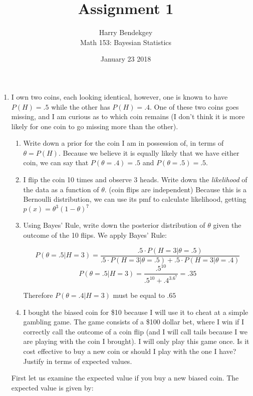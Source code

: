 \documentclass{article}
\title{Assignment 1}
\author{Harry Bendekgey \\ Math 153: Bayesian Statistics}
\date{January 23 2018}
\begin{document}
\maketitle

\begin{enumerate} 

\item I own two coins, each looking identical, however, one is known to have $P(H)=.5$ while the other has $P(H)=.4$.  One of these two coins goes missing, and I am curious as to which coin remains (I don't think it is more likely for one coin to go missing more than the other).
\begin{enumerate} 

\item Write down a prior for the coin I am in possession of, in terms of $\theta=P(H)$.
Because we believe it is equally likely that we have either coin, we can say that $P(\theta=.4)=.5$ and $P(\theta=.5)=.5$.

\item I flip the coin 10 times and observe 3 heads.  Write down the {\it likelihood}  of the data as a function of $\theta$. (coin flips are independent)
Because this is a Bernoulli distribution, we can use its pmf to calculate likelihood, getting $p(x) = \theta^3(1-\theta)^7$

\item Using Bayes' Rule, write down the posterior distribution of $\theta$ given the outcome of the 10 flips.
We apply Bayes' Rule:

$$P(\theta=.5|H=3) = \frac{.5 \cdot P(H=3|\theta=.5)}{.5 \cdot P(H=3|\theta=.5) + .5 \cdot P(H=3|\theta=.4)}$$
$$P(\theta=.5|H=3) = \frac{.5^{10}}{.5^{10} + .4^3.6^7} = .35$$

Therefore $P(\theta=.4|H=3)$ must be equal to $.65$


\item I bought the biased coin for \$10 because I will use it to cheat at a simple gambling game.  The game consists of a \$100 dollar bet, where I win if I correctly call the outcome of a coin flip (and I will call tails because I we are playing with the coin I brought).  I will only play this game once.  Is it cost effective to buy a new coin or should I play with the one I have?  Justify in terms of expected values.
\end{enumerate}

First let us examine the expected value if you buy a new biased coin. The expected value is given by:


\end{enumerate}
\end{document}
